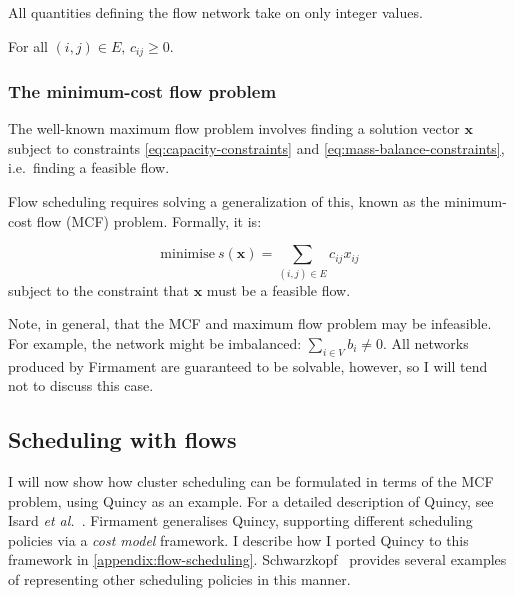 \begin{assumption}[Integrality] \label{assumption:integrality}
All quantities defining the flow network take on only integer values.\\
\end{assumption}

\begin{assumption} \label{assumption:non-negative-arc-costs}
For all $(i,j) \in E$, $c_{ij} \geq 0$. \\
\end{assumption}

\subsubsection{The minimum-cost flow problem} \label{sec:prep-flow-mcf}

The well-known maximum flow problem involves finding a solution vector
$\mathbf{x}$ subject to constraints \cref{eq:capacity-constraints} and \cref{eq:mass-balance-constraints}, i.e.\ finding a feasible flow.

Flow scheduling requires solving a generalization of this, known as the minimum-cost flow (MCF) problem. Formally, it is:

\begin{equation} \label{eq:mcf-primal-problem}
\mbox{minimise}\ s(\mathbf{x})=\sum_{(i,j)\in E}c_{ij}x_{ij}
\end{equation}
subject to the constraint that $\mathbf{x}$ must be a feasible flow.

Note, in general, that the MCF and maximum flow problem may be infeasible. For example, the network might be imbalanced: $\sum_{i\in V}b_{i}\neq0$. All networks produced by Firmament are guaranteed to be solvable, however, so I will tend not to discuss this case\footnotemark.

\subsection{Scheduling with flows} \label{sec:prep-flow-scheduling}

I will now show how cluster scheduling can be formulated in terms of the MCF problem, using Quincy as an example. For a detailed description of Quincy, see Isard \textit{et al.}~\cite{Isard:2009}. Firmament generalises Quincy, supporting different scheduling policies via a \emph{cost model} framework. I describe how I ported Quincy to this framework in \cref{appendix:flow-scheduling}. Schwarzkopf~\cite[ch.~5]{Schwarzkopf:2015} provides several examples of representing other scheduling policies in this manner.

